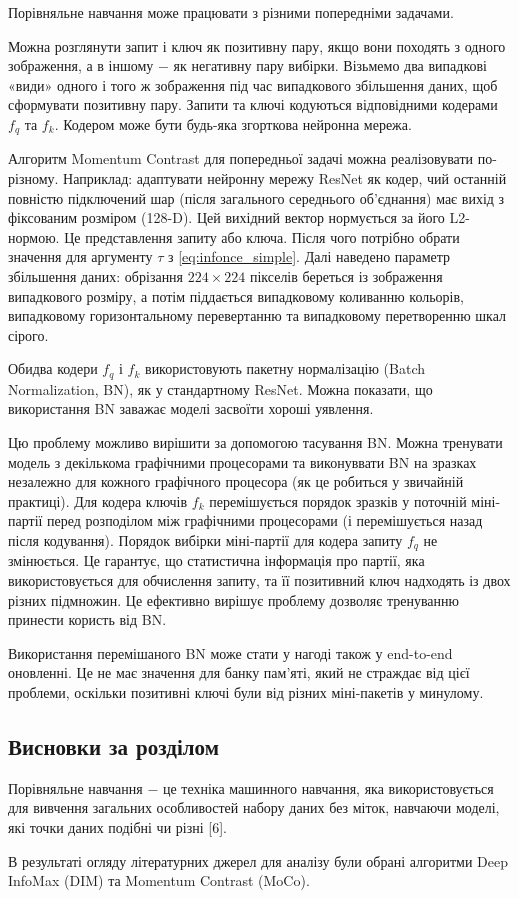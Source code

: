 Порівняльне навчання може працювати з різними попередніми задачами.

Можна розглянути запит і ключ як позитивну пару, якщо вони походять з одного зображення, а в іншому $-$ як негативну пару вибірки. Візьмемо два випадкові «види» одного і того ж зображення під час випадкового збільшення даних, щоб сформувати позитивну пару. Запити та ключі кодуються відповідними кодерами $f_{q}$ та $f_{k}$. Кодером може бути будь-яка згорткова нейронна мережа.

Алгоритм Momentum Contrast для попередньої задачі можна реалізовувати по-різному. Наприклад: адаптувати нейронну мережу ResNet як кодер, чий останній повністю підключений шар (після загального середнього об'єднання) має вихід з фіксованим розміром (128-D). Цей вихідний вектор нормується за його L2-нормою. Це представлення запиту або ключа. Після чого потрібно обрати значення для аргументу $\tau$ з \ref{eq:infonce_simple}. Далі наведено параметр збільшення даних: обрізання $224 \times 224$ пікселів береться із зображення випадкового розміру, а потім піддається випадковому коливанню кольорів, випадковому горизонтальному перевертанню та випадковому перетворенню шкал сірого.

Обидва кодери $f_{q}$ і $f_{k}$ використовують пакетну нормалізацію (Batch Normalization, BN), як у стандартному ResNet. Можна показати, що використання BN заважає моделі засвоїти хороші уявлення.

Цю проблему можливо вирішити за допомогою тасування BN. Можна тренувати модель з декількома графічними процесорами та виконуввати BN на зразках незалежно для кожного графічного процесора (як це робиться у звичайній практиці). Для кодера ключів $f_{k}$ перемішується порядок зразків у поточній міні-партії перед розподілом між графічними процесорами (і перемішується назад після кодування). Порядок вибірки міні-партії для кодера запиту $f_{q}$ не змінюється. Це гарантує, що статистична інформація про партії, яка використовується для обчислення запиту, та її позитивний ключ надходять із двох різних підмножин. Це ефективно вирішує проблему дозволяє тренуванню принести користь від BN.

Використання перемішаного BN може стати у нагоді також у end-to-end оновленні. Це не має значення для банку пам'яті, який не страждає від цієї проблеми, оскільки позитивні ключі були від різних міні-пакетів у минулому.

\subsection{Висновки за розділом}

Порівняльне навчання $-$ це техніка машинного навчання, яка використовується для вивчення загальних особливостей набору даних без міток, навчаючи моделі, які точки даних подібні чи різні [6].

В результаті огляду літературних джерел для аналізу були обрані алгоритми Deep InfoMax (DIM) та Momentum Contrast (MoCo).
